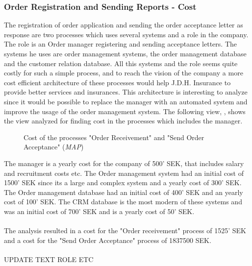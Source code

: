\subsubsection{Order Registration and Sending Reports - Cost}
\label{sec:order_analysis}
The registration of order application and sending the order acceptance letter as response are two processes which uses several systems and a role in the company. The role is an Order manager registering and sending acceptance letters. The systems he uses are order management systems, the order management database and the customer relation database. All this systems and the role seems quite costly for such a simple process, and to reach the vision of the company a more cost efficient architecture of these processes would help J.D.H. Insurance to provide better services and insurances. This architecture is interesting to analyze since it would be possible to replace the manager with an automated system and improve the usage of the order management system. The following view, , shows the view analyzed for finding cost in the processes which includes the manager.
\begin{center}
	\begin{figure}[H]
		\centering
		\setlength\fboxsep{7pt}
		\setlength\fboxrule{0.5pt}
		\caption{Cost of the processes "Order Receivement" and "Send Order Acceptance" (\emph{MAP})}
		\label{fig:map_order_cost}
	\end{figure}
\end{center}
The manager is a yearly cost for the company of 500' SEK, that includes salary and recruitment costs etc. The Order management system had an initial cost of 1500' SEK since its a large and complex system and a yearly cost of 300' SEK. The Order management database had an initial cost of 400' SEK and an yearly cost of 100' SEK. The CRM database is the most modern of these systems and was an initial cost of 700' SEK and is a yearly cost of 50' SEK.\\\\
%
The analysis resulted in a cost for the "Order receivement" process of 1525' SEK and a cost for the "Send Order Acceptance" process of 1837500 SEK.
%
\\\\UPDATE TEXT ROLE ETC

%
